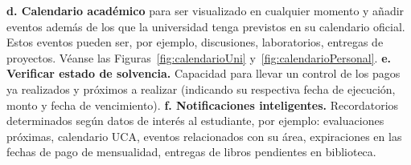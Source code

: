 \documentclass[12pt]{article}
\begin{document}
\setlength{\parindent}{0cm}
\textbf{d. Calendario académico} para ser visualizado en cualquier momento y añadir eventos además de los que la universidad tenga previstos en su calendario oficial. Estos eventos pueden ser, por ejemplo, discusiones, laboratorios, entregas de proyectos. Véanse las Figuras~\ref{fig:calendarioUni} y~\ref{fig:calendarioPersonal}.
\newline
\newline
\textbf{e. Verificar estado de solvencia. } Capacidad para llevar un control de los pagos ya realizados y pr\'oximos a realizar (indicando su respectiva fecha de ejecuci\'on, monto y fecha de vencimiento). 
\newline
\newline
\textbf{f. Notificaciones inteligentes. }Recordatorios determinados seg\'un  datos de inter\'es al estudiante, por ejemplo: evaluaciones pr\'oximas, calendario UCA, eventos relacionados con su \'area, expiraciones en las fechas de pago de mensualidad, entregas de libros pendientes en biblioteca.\\
\end{document}
